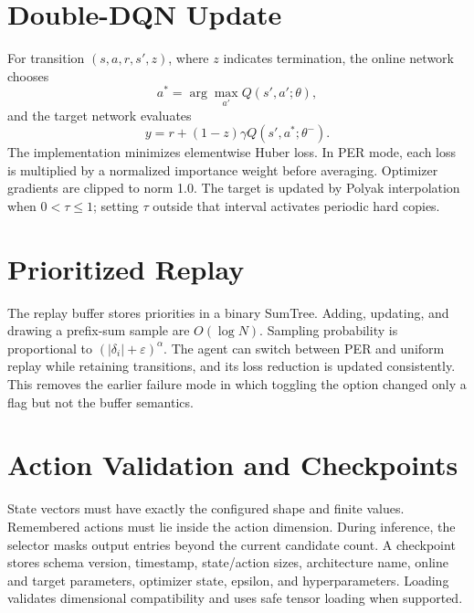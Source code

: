 \documentclass[12pt,a4paper,oneside]{report}
\begin{document}
\section{Double-DQN Update}
For transition $(s,a,r,s',z)$, where $z$ indicates termination, the online network chooses
\begin{equation}
a^*=\arg\max_{a'}Q(s',a';\theta),
\end{equation}
and the target network evaluates
\begin{equation}
y=r+(1-z)\gamma Q(s',a^*;\theta^-).
\end{equation}
The implementation minimizes elementwise Huber loss. In PER mode, each loss is multiplied by a normalized importance weight before averaging. Optimizer gradients are clipped to norm 1.0. The target is updated by Polyak interpolation when $0<\tau\le1$; setting $\tau$ outside that interval activates periodic hard copies.

\section{Prioritized Replay}
The replay buffer stores priorities in a binary SumTree. Adding, updating, and drawing a prefix-sum sample are $O(\log N)$. Sampling probability is proportional to $(|\delta_i|+\varepsilon)^\alpha$. The agent can switch between PER and uniform replay while retaining transitions, and its loss reduction is updated consistently. This removes the earlier failure mode in which toggling the option changed only a flag but not the buffer semantics.

\section{Action Validation and Checkpoints}
State vectors must have exactly the configured shape and finite values. Remembered actions must lie inside the action dimension. During inference, the selector masks output entries beyond the current candidate count. A checkpoint stores schema version, timestamp, state/action sizes, architecture name, online and target parameters, optimizer state, epsilon, and hyperparameters. Loading validates dimensional compatibility and uses safe tensor loading when supported.
\end{document}
